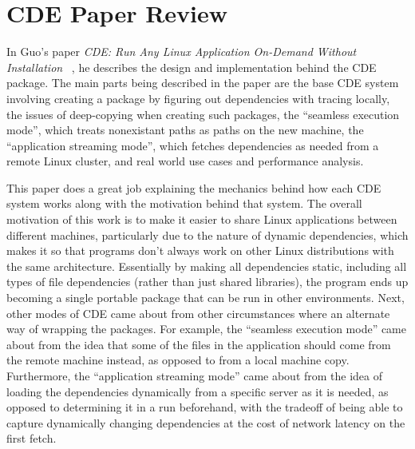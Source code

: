 \documentclass[11pt]{article}
\newcommand{\cde}{\textsc{CDE}\xspace}
\begin{document}
\section*{CDE Paper Review}

In Guo's paper \textit{CDE: Run Any Linux Application On-Demand Without Installation} ~\cite{10.1109/MCSE.2012.36}, he describes the design and implementation behind the \cde package. The main parts being described in the paper are the base \cde system involving creating a package by figuring out dependencies with tracing locally, the issues of deep-copying when creating such packages, the ``seamless execution mode'', which treats nonexistant paths as paths on the new machine, the ``application streaming mode'', which fetches dependencies as needed from a remote Linux cluster, and real world use cases and performance analysis.

This paper does a great job explaining the mechanics behind how each \cde system works along with the motivation behind that system. The overall motivation of this work is to make it easier to share Linux applications between different machines, particularly due to the nature of dynamic dependencies, which makes it so that programs don't always work on other Linux distributions with the same architecture. Essentially by making all dependencies static, including all types of file dependencies (rather than just shared libraries), the program ends up becoming a single portable package that can be run in other environments. Next, other modes of \cde came about from other circumstances where an alternate way of wrapping the packages. For example, the ``seamless execution mode'' came about from the idea that some of the files in the application should come from the remote machine instead, as opposed to from a local machine copy. Furthermore, the ``application streaming mode'' came about from the idea of loading the dependencies dynamically from a specific server as it is needed, as opposed to determining it in a run beforehand, with the tradeoff of being able to capture dynamically changing dependencies at the cost of network latency on the first fetch.
\end{document}
